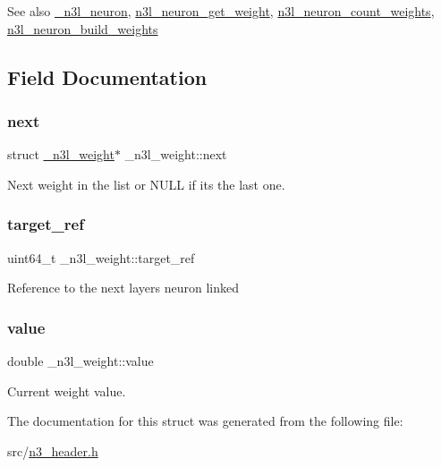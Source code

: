 \begin{DoxySeeAlso}{See also}
\hyperlink{struct__n3l__neuron}{\+\_\+n3l\+\_\+neuron}, \hyperlink{n3__neuron_8c_a3a3cc0184911922f7e0d04956d8587a8}{n3l\+\_\+neuron\+\_\+get\+\_\+weight}, \hyperlink{n3__neuron_8c_a8dbe10c6a0fec3f90e08a677c44db4cb}{n3l\+\_\+neuron\+\_\+count\+\_\+weights}, \hyperlink{n3__neuron_8c_ada950fd1fa5d1b718c66ddd0d74604d0}{n3l\+\_\+neuron\+\_\+build\+\_\+weights} 
\end{DoxySeeAlso}


\subsection{Field Documentation}
\mbox{\label{struct__n3l__weight_adf96faae4820538377678c82ec96d48e}} 
\subsubsection{\texorpdfstring{next}{next}}
{\footnotesize\ttfamily struct \hyperlink{struct__n3l__weight}{\+\_\+n3l\+\_\+weight}$\ast$ \+\_\+n3l\+\_\+weight\+::next}

Next weight in the list or N\+U\+LL if it\textquotesingle{}s the last one. \mbox{\label{struct__n3l__weight_ac5094b52f09a092ffb1cdc4cc594f38f}} 
\subsubsection{\texorpdfstring{target\+\_\+ref}{target\_ref}}
{\footnotesize\ttfamily uint64\+\_\+t \+\_\+n3l\+\_\+weight\+::target\+\_\+ref}

Reference to the next layer\textquotesingle{}s neuron linked \mbox{\label{struct__n3l__weight_a1d1ebc5e04ba1dd26094993dd94aa710}} 
\subsubsection{\texorpdfstring{value}{value}}
{\footnotesize\ttfamily double \+\_\+n3l\+\_\+weight\+::value}

Current weight value. 

The documentation for this struct was generated from the following file\+:\begin{DoxyCompactItemize}
\item 
src/\hyperlink{n3__header_8h}{n3\+\_\+header.\+h}\end{DoxyCompactItemize}
